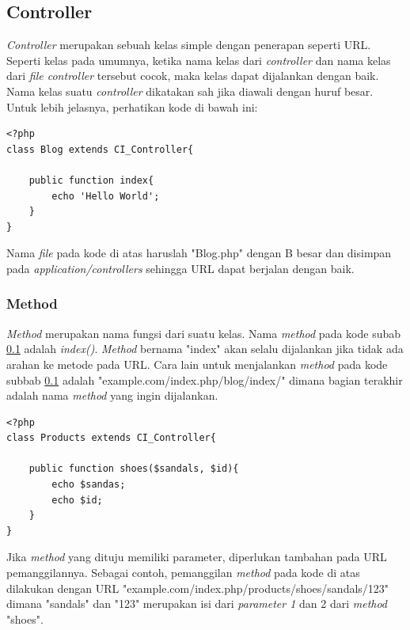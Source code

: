 \subsection{Controller}
\label{sub: controller}

	\textit{Controller} merupakan sebuah kelas simple dengan penerapan seperti URL. Seperti kelas pada umumnya, ketika nama kelas dari \textit{controller} dan nama kelas dari \textit{file controller} tersebut cocok, maka kelas dapat dijalankan dengan baik. Nama kelas suatu \textit{controller} dikatakan sah jika diawali dengan huruf besar. Untuk lebih jelasnya, perhatikan kode di bawah ini:
	
\begin{lstlisting}
<?php
class Blog extends CI_Controller{
	
	public function index{
		echo 'Hello World';
	}
}
\end{lstlisting}

	Nama \textit{file} pada kode di atas haruslah  "Blog.php" dengan B besar dan disimpan pada \textit{application/controllers} sehingga URL dapat berjalan dengan baik.
	
\subsubsection{Method}
\label{subsub: method}

	\textit{Method} merupakan nama fungsi dari suatu kelas. Nama \textit{method} pada kode subab \ref{sub: controller} adalah \textit{index()}. \textit{Method} bernama "index" akan selalu dijalankan jika tidak ada arahan ke metode pada URL. Cara lain untuk menjalankan \textit{method} pada kode subbab \ref{sub: controller} adalah "example.com/index.php/blog/index/" dimana bagian terakhir adalah nama \textit{method} yang ingin dijalankan.
	
	
	\begin{lstlisting}
<?php
class Products extends CI_Controller{

	public function shoes($sandals, $id){
		echo $sandas;
		echo $id;
	}
}
	\end{lstlisting}
	
	Jika \textit{method} yang dituju memiliki parameter, diperlukan tambahan pada URL pemanggilannya. Sebagai contoh, pemanggilan \textit{method}	pada kode di atas dilakukan dengan URL "example.com/index.php/products/shoes/sandals/123" dimana "sandals" dan "123" merupakan isi dari \textit{parameter 1} dan 2 dari \textit{method} "shoes".
	
